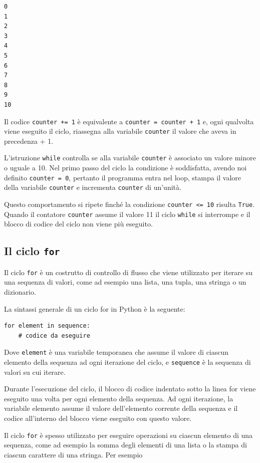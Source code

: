 \documentclass[
  letterpaper,
  krantz2]{{[}./krantz{]}}
\begin{document}
\begin{verbatim}
0
1
2
3
4
5
6
7
8
9
10
\end{verbatim}

Il codice \texttt{counter\ +=\ 1} è equivalente a
\texttt{counter\ =\ counter\ +\ 1} e, ogni qualvolta viene eseguito il
ciclo, riassegna alla variabile \texttt{counter} il valore che aveva in
precedenza + 1.

L'istruzione \texttt{while} controlla se alla variabile \texttt{counter}
è associato un valore minore o uguale a 10. Nel primo passo del ciclo la
condizione è soddisfatta, avendo noi definito \texttt{counter\ =\ 0},
pertanto il programma entra nel loop, stampa il valore della variabile
\texttt{counter} e incrementa \texttt{counter} di un'unità.

Questo comportamento si ripete finché la condizione
\texttt{counter\ \textless{}=\ 10} risulta \texttt{True}. Quando il
contatore \texttt{counter} assume il valore 11 il ciclo \texttt{while}
si interrompe e il blocco di codice del ciclo non viene più eseguito.

\subsection{\texorpdfstring{Il ciclo
\texttt{for}}{Il ciclo for}}\label{il-ciclo-for}

Il ciclo \texttt{for} è un costrutto di controllo di flusso che viene
utilizzato per iterare su una sequenza di valori, come ad esempio una
lista, una tupla, una stringa o un dizionario.

La sintassi generale di un ciclo for in Python è la seguente:

\begin{verbatim}
for element in sequence:
    # codice da eseguire
\end{verbatim}

Dove \texttt{element} è una variabile temporanea che assume il valore di
ciascun elemento della sequenza ad ogni iterazione del ciclo, e
\texttt{sequence} è la sequenza di valori su cui iterare.

Durante l'esecuzione del ciclo, il blocco di codice indentato sotto la
linea for viene eseguito una volta per ogni elemento della sequenza. Ad
ogni iterazione, la variabile elemento assume il valore dell'elemento
corrente della sequenza e il codice all'interno del blocco viene
eseguito con questo valore.

Il ciclo \texttt{for} è spesso utilizzato per eseguire operazioni su
ciascun elemento di una sequenza, come ad esempio la somma degli
elementi di una lista o la stampa di ciascun carattere di una stringa.
Per esempio
\end{document}
